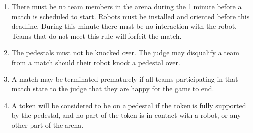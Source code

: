 \begin{enumerate}
\item There must be no team members in the arena during the 1 minute before a match is scheduled to start.
      Robots must be installed and oriented before this deadline.
      During this minute there must be no interaction with the robot.
      Teams that do not meet this rule will forfeit the match.

\item The pedestals must not be knocked over.
      The judge may disqualify a team from a match should their robot knock a pedestal over.

\item A match may be terminated prematurely if all teams participating in that match state to the judge that they are happy for the game to end.

\item A token will be considered to be on a pedestal if the token is fully supported by the pedestal, and no part of the token is in contact with a robot, or any other part of the arena.

\end{enumerate}
